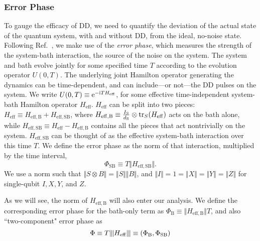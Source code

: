 \documentclass[twocolumn,pra,superscriptaddress]{revtex4-2}
\newcommand{\Heff}{H_\mathrm{eff}}
\newcommand{\HeffB}{H_\mathrm{eff,B}}
\newcommand{\HeffSB}{H_\mathrm{eff,SB}}
\newcommand{\ep}{\Phi_\mathrm{SB}}
\newcommand{\epB}{\Phi_\mathrm{B}}
\begin{document}
\subsubsection{Error Phase}
To gauge the efficacy of DD, we need to quantify the deviation of the actual state of the quantum system, with and without DD, from the ideal, no-noise state. Following Ref.~\cite{khodjasteh2007performance}, we make use of the \emph{error phase}, which measures the strength of the system-bath interaction, the source of the noise on the system. The system and bath evolve jointly for some specified time $T$ according to the evolution operator $U(0,T)$. The underlying joint Hamilton operator generating the dynamics can be time-dependent, and can include---or not---the DD pulses on the system. We write $U(0,T)\equiv \upe^{-\upi T\Heff}$, for some effective time-independent system-bath Hamilton operator $\Heff$. $\Heff$ can be split into two pieces: $\Heff\equiv \HeffB+\HeffSB$, where $\HeffB\equiv \frac{I_\mathrm{S}}{d_\mathrm{S}}\otimes\tr_S(\Heff)$ acts on the bath alone, while $\HeffSB\equiv \Heff-\HeffB$ contains all the pieces that act nontrivially on the system. $\HeffSB$ can be thought of as the effective system-bath interaction over this time $T$. We define the error phase as the norm of that interaction, multiplied by the time interval,
\begin{equation}\label{eq:ErrorPhase}
\ep\equiv T\Vert\HeffSB\Vert .
\end{equation}
We use a norm such that $\Vert S\otimes B\Vert = \Vert S\Vert \Vert B\Vert$, and $\Vert I\Vert =1=\Vert X\Vert = \Vert Y \Vert =\Vert Z\Vert$ for single-qubit $I, X, Y$, and $Z$.

As we will see, the norm of $\HeffB$ will also enter our analysis. We define the corresponding error phase for the bath-only term as $\epB\equiv \Vert\HeffB\Vert T$, and also ``two-component" error phase as
\begin{equation}
\Phi\equiv T\opnorm{\Heff}\equiv (\epB,\ep)
\end{equation}
\end{document}
